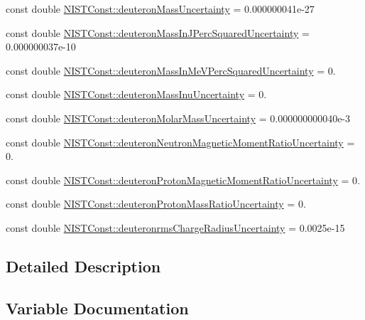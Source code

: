 \begin{DoxyCompactItemize}
\item 
const double \hyperlink{group___n_i_s_t_const-_deuteron_ga70a72db5719cf2c6966086755689b0dd}{N\+I\+S\+T\+Const\+::deuteron\+Mass\+Uncertainty} = 0.\+000000041e-\/27
\item 
const double \hyperlink{group___n_i_s_t_const-_deuteron_ga03d5482fc1395d5d86ad8f8dfa068898}{N\+I\+S\+T\+Const\+::deuteron\+Mass\+In\+J\+Perc\+Squared\+Uncertainty} = 0.\+000000037e-\/10
\item 
const double \hyperlink{group___n_i_s_t_const-_deuteron_ga54f9a7510840315ea70a2e80a8f17b67}{N\+I\+S\+T\+Const\+::deuteron\+Mass\+In\+Me\+V\+Perc\+Squared\+Uncertainty} = 0.
\item 
const double \hyperlink{group___n_i_s_t_const-_deuteron_ga1d3fb0b06eb4664179fb8783ed9e6400}{N\+I\+S\+T\+Const\+::deuteron\+Mass\+Inu\+Uncertainty} = 0.
\item 
const double \hyperlink{group___n_i_s_t_const-_deuteron_gace97511b28a700fa1a71851fb81fec9a}{N\+I\+S\+T\+Const\+::deuteron\+Molar\+Mass\+Uncertainty} = 0.\+000000000040e-\/3
\item 
const double \hyperlink{group___n_i_s_t_const-_deuteron_gaede395611d2937f8d50bc1880ac54c7b}{N\+I\+S\+T\+Const\+::deuteron\+Neutron\+Magnetic\+Moment\+Ratio\+Uncertainty} = 0.
\item 
const double \hyperlink{group___n_i_s_t_const-_deuteron_ga9610f6aea60f85c4026e20df7c81d185}{N\+I\+S\+T\+Const\+::deuteron\+Proton\+Magnetic\+Moment\+Ratio\+Uncertainty} = 0.
\item 
const double \hyperlink{group___n_i_s_t_const-_deuteron_gac6ad804fc55f7b5e1424efb9cca55f7d}{N\+I\+S\+T\+Const\+::deuteron\+Proton\+Mass\+Ratio\+Uncertainty} = 0.
\item 
const double \hyperlink{group___n_i_s_t_const-_deuteron_ga2ab958821d61f10241d90dd6736ef22c}{N\+I\+S\+T\+Const\+::deuteronrms\+Charge\+Radius\+Uncertainty} = 0.\+0025e-\/15
\end{DoxyCompactItemize}


\subsection{Detailed Description}


\subsection{Variable Documentation}
\mbox{\label{group___n_i_s_t_const-_deuteron_gaa01fffefa3ab64430fabf08808572689}} 
